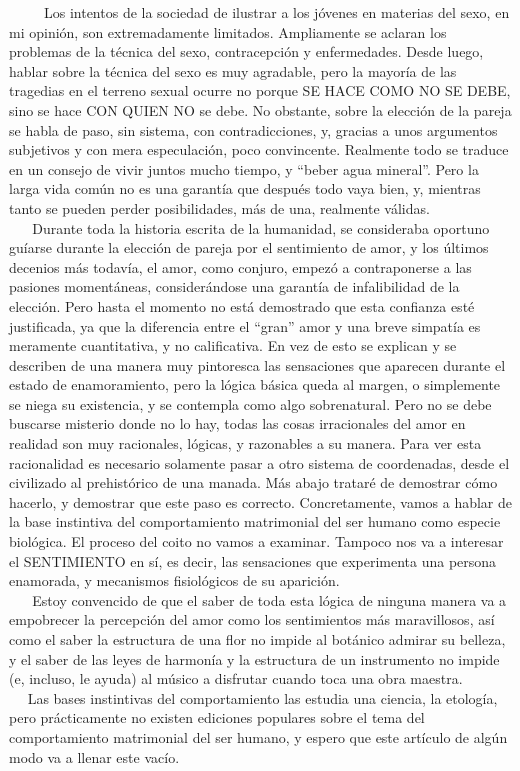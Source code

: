 ~ ~ ~ Los intentos de la sociedad de ilustrar a los jóvenes en materias
del sexo, en mi opinión, son extremadamente limitados. Ampliamente se
aclaran los problemas de la técnica del sexo, contracepción y
enfermedades. Desde luego, hablar sobre la técnica del sexo es muy
agradable, pero la mayoría de las tragedias en el terreno sexual ocurre
no porque SE HACE COMO NO SE DEBE, sino se hace CON QUIEN NO se debe. No
obstante, sobre la elección de la pareja se habla de paso, sin sistema,
con contradicciones, y, gracias a unos argumentos subjetivos y con mera
especulación, poco convincente. Realmente todo se traduce en un consejo
de vivir juntos mucho tiempo, y ``beber agua mineral''. Pero la larga
vida común no es una garantía que después todo vaya bien, y, mientras
tanto se pueden perder posibilidades, más de una, realmente válidas.\\
\hspace*{0.333em} ~ ~ Durante toda la historia escrita de la humanidad,
se consideraba oportuno guíarse durante la elección de pareja por el
sentimiento de amor, y los últimos decenios más todavía, el amor, como
conjuro, empezó a contraponerse a las pasiones momentáneas,
considerándose una garantía de infalibilidad de la elección. Pero hasta
el momento no está demostrado que esta confianza esté justificada, ya
que la diferencia entre el ``gran'' amor y una breve simpatía es
meramente cuantitativa, y no calificativa. En vez de esto se explican y
se describen de una manera muy pintoresca las sensaciones que aparecen
durante el estado de enamoramiento, pero la lógica básica queda al
margen, o simplemente se niega su existencia, y se contempla como algo
sobrenatural. Pero no se debe buscarse misterio donde no lo hay, todas
las cosas irracionales del amor en realidad son muy racionales, lógicas,
y razonables a su manera. Para ver esta racionalidad es necesario
solamente pasar a otro sistema de coordenadas, desde el civilizado al
prehistórico de una manada. Más abajo trataré de demostrar cómo hacerlo,
y demostrar que este paso es correcto. Concretamente, vamos a hablar de
la base instintiva del comportamiento matrimonial del ser humano como
especie biológica. El proceso del coito no vamos a examinar. Tampoco nos
va a interesar el SENTIMIENTO en sí, es decir, las sensaciones que
experimenta una persona enamorada, y mecanismos fisiológicos de su
aparición.\\
\hspace*{0.333em} ~ ~ Estoy convencido de que el saber de toda esta
lógica de ninguna manera va a empobrecer la percepción del amor como los
sentimientos más maravillosos, así como el saber la estructura de una
flor no impide al botánico admirar su belleza, y el saber de las leyes
de harmonía y la estructura de un instrumento no impide (e, incluso, le
ayuda) al músico a disfrutar cuando toca una obra maestra.\\
\hspace*{0.333em} ~ ~Las bases instintivas del comportamiento las estudia una
ciencia, la etología, pero prácticamente no existen ediciones populares
sobre el tema del comportamiento matrimonial del ser humano, y espero
que este artículo de algún modo va a llenar este vacío.

